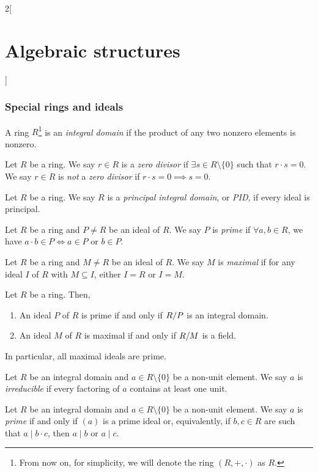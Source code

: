 \documentclass[../../../main.tex]{subfiles}
\begin{document}
\begin{multicols}{2}[\section{Algebraic structures}]
\subsubsection*{Special rings and ideals}
\begin{definition}
    A ring $R$\footnote{From now on, for simplicity, we will denote the ring $(R,+,\cdot)$ as $R$.} is an \textit{integral domain} if the product of any two nonzero elements is nonzero.
\end{definition}
\begin{definition}
    Let $R$ be a ring. We say $r\in R$ is a \textit{zero divisor} if $\exists s\in R\setminus\{0\}$ such that $r\cdot s=0$. We say $r\in R$ is \textit{not} a \textit{zero divisor} if $r\cdot s=0\implies s=0$. 
\end{definition}
\begin{definition}
    Let $R$ be a ring. We say $R$ is a \textit{principal integral domain}, or \textit{PID}, if every ideal is principal.
\end{definition}
\begin{definition}
    Let $R$ be a ring and $P\ne R$ be an ideal of $R$. We say $P$ is \textit{prime} if $\forall a,b\in R$, we have $a\cdot b\in P\iff a\in P\text{ or }b\in P$.
\end{definition}
\begin{definition}
    Let $R$ be a ring and $M\ne R$ be an ideal of $R$. We say $M$ is \textit{maximal} if for any ideal $I$ of $R$ with $M\subseteq I$, either $I=R$ or $I=M$.
\end{definition}
\begin{prop}
    Let $R$ be a ring. Then,
    \begin{enumerate}
        \item An ideal $P$ of $R$ is prime if and only if $\quot{R}{P}$ is an integral domain.
        \item An ideal $M$ of $R$ is maximal if and only if $\quot{R}{M}$ is a field.
    \end{enumerate}
    In particular, all maximal ideals are prime.
\end{prop}
\begin{definition}
    Let $R$ be an integral domain and $a\in R\setminus\{0\}$ be a non-unit element. We say $a$ is \textit{irreducible} if every factoring of $a$ contains at least one unit. 
\end{definition}
\begin{definition}
    Let $R$ be an integral domain and $a\in R\setminus\{0\}$ be a non-unit element. We say $a$ is \textit{prime} if and only if $(a)$ is a prime ideal or, equivalently, if $b,c\in R$ are such that $a\mid b\cdot c$, then $a\mid b$ or $a\mid c$. 

\end{definition}
\end{multicols}
\end{document}
